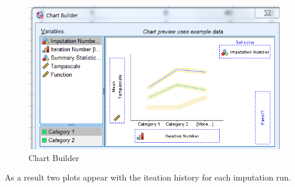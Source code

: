\documentclass[
]{book}
\begin{document}
\begin{figure}

{\centering \includegraphics[width=0.9\linewidth]{images/fig4.15} 

}

\caption{Chart Builder}\label{fig:fig4-15}
\end{figure}

As a result two plots appear with the iteation history for each imputation run.
\end{document}
